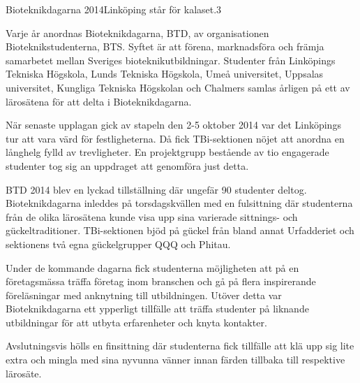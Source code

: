 \begin{news}{2}{Bioteknikdagarna 2014}{Linköping står för kalaset.}{}{3}


Varje år anordnas Bioteknikdagarna, BTD, av organisationen
Bioteknikstudenterna, BTS. Syftet är att förena, marknadsföra och
främja samarbetet mellan Sveriges bioteknikutbildningar. Studenter
från Linköpings Tekniska Högskola, Lunds Tekniska Högskola, Umeå
universitet, Uppsalas universitet, Kungliga Tekniska Högskolan och
Chalmers samlas årligen på ett av lärosätena för att delta i
Bioteknikdagarna.



När senaste upplagan gick av stapeln den 2-5 oktober 2014 var det
Linköpings tur att vara värd för festligheterna. Då fick TBi-sektionen
nöjet att anordna en långhelg fylld av trevligheter.  En projektgrupp
bestående av tio engagerade studenter tog sig an uppdraget att
genomföra just detta.

BTD 2014 blev en lyckad tillställning där ungefär 90 studenter
deltog. Bioteknikdagarna inleddes på torsdagskvällen med en
fulsittning där studenterna från de olika lärosätena kunde visa upp
sina varierade sittnings- och gückeltraditioner. TBi-sektionen bjöd på
gückel från bland annat Urfadderiet och sektionens två egna
gückelgrupper QQQ och Phitau.

Under de kommande dagarna fick studenterna möjligheten att på en
företagsmässa träffa företag inom branschen och gå på flera
inspirerande föreläsningar med anknytning till utbildningen. Utöver
detta var Bioteknikdagarna ett ypperligt tillfälle att träffa
studenter på liknande utbildningar för att utbyta erfarenheter och
knyta kontakter.

Avslutningsvis hölls en finsittning där studenterna fick tillfälle att
klä upp sig lite extra och mingla med sina nyvunna vänner innan färden
tillbaka till respektive lärosäte.
\end{news}

